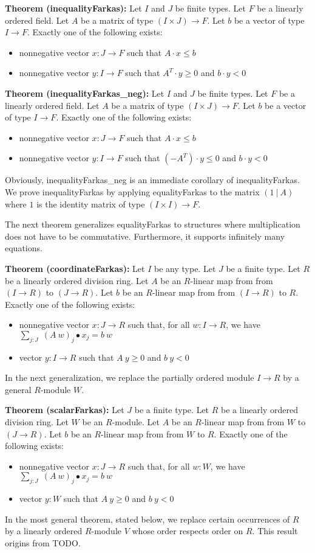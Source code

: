 \documentclass[]{article}
\renewcommand{\.}{\hskip .75pt}
\let\r=\rightarrow
\let\*=\cdot
\begin{document}
\medskip \noindent
\textbf{Theorem (inequalityFarkas):}
Let $I$ and $J$ be finite types.
Let $F$ be a linearly ordered field.
Let $A$ be a matrix of type $(I \times J) \r F$.
Let $b$ be a vector of type $I \r F$.
Exactly one of the following exists:
\begin{itemize}
\item nonnegative vector $x : J \r F$ such that $A \* x \le b$
\item nonnegative vector $y : I \r F$ such that $A^T\! \* y \ge 0$ and $b \* y < 0$
\end{itemize}
\textbf{Theorem (inequalityFarkas\_neg):}
Let $I$ and $J$ be finite types.
Let $F$ be a linearly ordered field.
Let $A$ be a matrix of type $(I \times J) \r F$.
Let $b$ be a vector of type $I \r F$.
Exactly one of the following exists:
\begin{itemize}
\item nonnegative vector $x : J \r F$ such that $A \* x \le b$
\item nonnegative vector $y : I \r F$ such that $(-A^T) \* y \le 0$ and $b \* y < 0$
\end{itemize}
Obviously, inequalityFarkas\_neg is an immediate corollary of inequalityFarkas.
We prove inequalityFarkas by applying equalityFarkas 
to the matrix $(1~|~A)$ where $1$ is the identity matrix of type
$(I \times I) \r F$.

The next theorem generalizes equalityFarkas to structures where
multiplication does not have to be commutative.
Furthermore, it supports infinitely many equations.

\medskip \noindent
\textbf{Theorem (coordinateFarkas):}
Let $I$ be any type.
Let $J$ be a finite type.
Let $R$ be a linearly ordered division ring.
Let $A$ be an $R$-linear map from from $(I \r R)$ to $(J \r R)$.
Let $b$ be an $R$-linear map from from $(I \r R)$ to $R$.
Exactly one of the following exists:
\begin{itemize}
\item nonnegative vector $x : J \r R$ such that, for all $w : I \r R$, we have
$ \sum_{j : J}\; (A~w)_j \bullet x_j = b~w $
\item vector $y : I \r R$ such that $A~y \ge 0$ and $b~y < 0$
\end{itemize}
In the next generalization, we replace the partially ordered module $I \r R$ by
a general $R$-module $W$.

\medskip \noindent
\textbf{Theorem (scalarFarkas):}
Let $J$ be a finite type.
Let $R$ be a linearly ordered division ring.
Let $W$ be an $R$-module.
Let $A$ be an $R$-linear map from from $W$ to $(J \r R)$.
Let $b$ be an $R$-linear map from from $W$ to $R$.
Exactly one of the following exists:
\begin{itemize}
\item nonnegative vector $x : J \r R$ such that, for all $w : W$, we have
$ \sum_{j : J}\; (A~w)_j \bullet x_j = b~w $
\item vector $y : W$ such that $A~y \ge 0$ and $b~y < 0$
\end{itemize}
In the most general theorem, stated below, we replace certain occurrences of $R$ by
a linearly ordered $R$-module $V$ whose order respects order on $R$.
This result origins from TODO.
\end{document}
